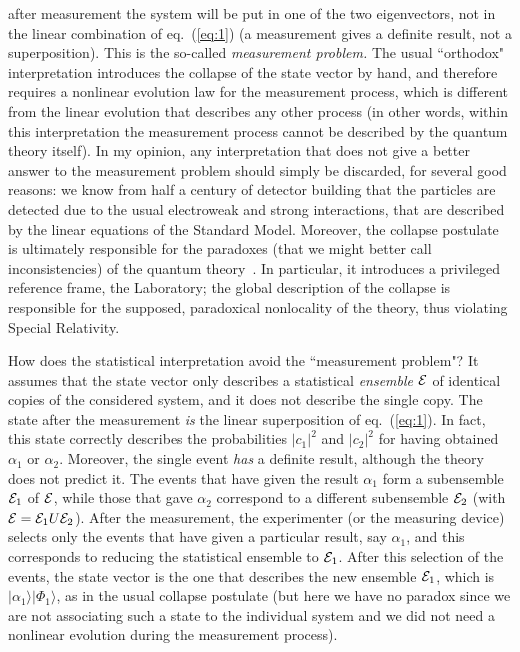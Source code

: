 \documentclass[published]{JHEP3}
\begin{document}
after measurement the system will be put in one of the two
eigenvectors, not in the linear combination of eq.~(\ref{eq:1}) (a
measurement gives a definite result, not a superposition). This is the
so-called \emph{measurement problem.} The usual ``orthodox"
interpretation introduces the collapse of the state vector by hand,
and therefore requires a nonlinear evolution law for the measurement
process, which is different from the linear evolution that describes
any other process (in other words, within this interpretation the
measurement process cannot be described by the quantum theory
itself). In my opinion, any interpretation that does not give a better
answer to the measurement problem should simply be discarded, for
several good reasons: we know from half a century of detector building
that the particles are detected due to the usual electroweak and
strong interactions, that are described by the linear equations of the
Standard Model. Moreover, the collapse postulate is ultimately
responsible for the paradoxes (that we might better call
inconsistencies) of the quantum theory~\cite{Ballentine70,Laloe}. In
particular, it introduces a privileged reference frame, the
Laboratory; the global description of the collapse is responsible for
the supposed, paradoxical nonlocality of the theory, thus violating
Special Relativity.

How does the statistical interpretation avoid the ``measurement
problem"? It assumes that the state vector only describes a
statistical \emph{ensemble} ${\cal E}$ of identical copies of the
considered system, and it does not describe the single copy. The
state after the measurement \emph{is} the linear superposition of
eq.~(\ref{eq:1}). In fact, this state correctly describes the
probabilities $\vert c_1\vert^2$ and $\vert c_2\vert^2$  for
having obtained $\alpha_1$ or $\alpha_2$. Moreover, the single
event \emph{has} a definite result, although the theory does not
predict it. The events that have given the result $\alpha_1$ form
a subensemble ${\cal E}_1$ of ${\cal E}$, while those that gave
$\alpha_2$ correspond to a different subensemble ${\cal E}_2$
(with ${\cal E}={\cal E}_1U{\cal E}_2$). After the measurement,
the experimenter (or the measuring device) selects only the events
that have given a particular result, say $\alpha_1$, and this
corresponds to reducing the statistical ensemble to  ${\cal E}_1$.
After this selection of the events, the state vector is the one
that describes the new ensemble ${\cal E}_1$, which is $\vert
\alpha_1\rangle\vert\Phi_1\rangle$, as in the usual collapse
postulate (but here we have no paradox since we are not
associating such a state to the individual system and we did not
need a nonlinear evolution during the measurement process).
\end{document}
